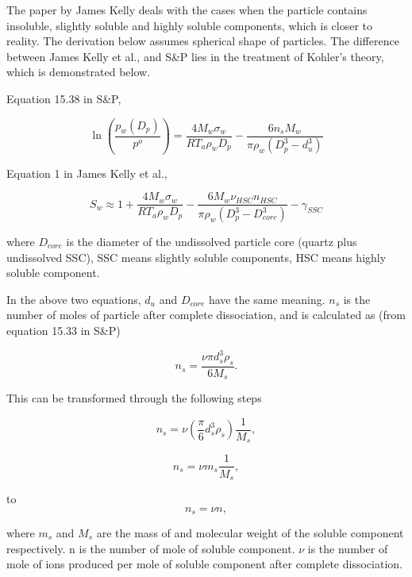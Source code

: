\documentclass[12pt]{amsart}
\begin{document}
The paper by James Kelly deals with the cases when the particle contains insoluble, slightly soluble and  highly soluble components, which is closer to reality. The derivation below assumes spherical shape of particles. The difference between James Kelly et al., and S\&P lies in the treatment of Kohler's theory, which is demonstrated below.

Equation 15.38 in S\&P, 

\begin{equation}\label{eqn:36}
\ln(\frac{p_{w}(D_{p})}{p^{o}})=\frac{4M_{w}\sigma_{w}}{RT_{a}\rho_{w} D_{p}}-\frac{6n_{s}M_{w}}{\pi\rho_{w}(D_{p}^{3}-d_{u}^{3})}
\end{equation}

Equation 1 in James Kelly et al., 

\begin{equation}\label{eqn:37}
S_{w}\approx 1+\frac{4M_{w}\sigma_{w}}{RT_{a}\rho_{w}D_{p}}-\frac{6M_{w}\nu_{HSC}n_{HSC}}{\pi \rho_{w}(D_{p}^{3}-D_{core}^{3})}-\gamma_{SSC}
\end{equation}

where $D_{core}$ is the diameter of the undissolved particle core (quartz plus undissolved SSC), SSC means slightly soluble components, HSC means highly soluble component.

In the above two equations, $d_{u}$ and $D_{core}$ have the same meaning.  $n_{s}$ is the number of moles of particle after complete dissociation, and is calculated as (from equation 15.33 in S\&P) 

\begin{equation}\label{eqn:38}
n_{s}=\frac{\nu \pi d_{s}^{3} \rho_{s}}{6 M_{s}}.
\end{equation}

This can be transformed through the following steps

\begin{equation}\label{eqn:39}
n_{s}=\nu (\frac{\pi}{6}d_{s}^{3} \rho_{s} ) \frac{1}{M_{s}},
\end{equation}


\begin{equation}\label{eqn:40}
n_{s}=\nu m_{s}  \frac{1}{M_{s}},
\end{equation}

to 
\begin{equation}\label{eqn:41}
n_{s}=\nu n,
\end{equation}

where $m_{s}$ and $M_{s}$ are the mass of and molecular weight of the soluble component respectively. n is the number of mole of soluble component. $\nu$ is the number of mole of ions produced per mole of soluble component after complete dissociation.
\end{document}
